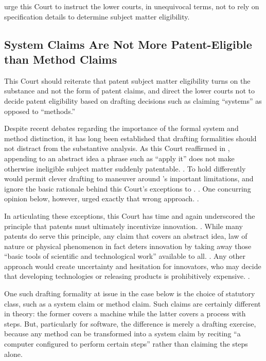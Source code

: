 \documentclass{scotus}
\begin{document}
\Amici urge this Court to instruct the lower courts, in unequivocal
terms, not to rely on specification details to determine subject matter
eligibility.



%
%
\subsection{System Claims Are Not More Patent-Eligible than Method Claims}

This Court should reiterate that patent subject matter eligibility turns on the
substance and not the form of patent claims, and direct
the lower courts not to decide patent eligibility based on drafting
decisions such as claiming “systems” as opposed to “methods.” 

Despite recent debates regarding the importance of the formal system and method
distinction, it has long been established that drafting formalities should not
distract from
the substantive  analysis.  As this Court reaffirmed in
, appending to an abstract idea
a phrase such as “apply it” does
not make otherwise ineligible subject matter suddenly patentable. .  To hold differently would permit clever drafting to maneuver around
's important limitations, and ignore the basic rationale behind this
Court's exceptions to . . One concurring
opinion below, however, urged exactly that wrong approach. .

In articulating these
exceptions, this Court has time and again underscored the principle that patents
must ultimately incentivize innovation. . While many patents do serve this principle, any claim that
covers an abstract idea, law of nature or physical phenomenon in fact deters
innovation by taking away those “basic tools of scientific and technological
work”  available to all. . Any other approach
would create uncertainty and hesitation for innovators, who may decide
that developing technologies or releasing products is prohibitively
expensive. .

One such drafting formality at issue in the case below is the choice of
statutory class, such as a system
claim or method claim.
Such claims are certainly different in theory: the former covers a
machine while the latter covers a process with steps. But, particularly for
software, the difference is merely a drafting exercise, because any method can
be transformed into a system claim by reciting “a computer configured to perform
certain steps” rather than claiming the steps alone. 
\end{document}
